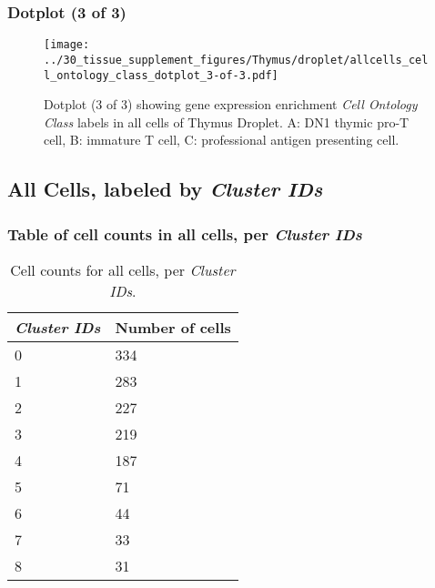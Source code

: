 \clearpage

\subsubsection{Dotplot (3 of 3)}
\begin{figure}[h]
\centering
\texttt{[image: ../30\_tissue\_supplement\_figures/Thymus/droplet/allcells\_cell\_ontology\_class\_dotplot\_3-of-3.pdf]}

\caption{ Dotplot (3 of 3)  showing gene expression enrichment \emph{Cell Ontology Class} labels in all cells of Thymus Droplet. A: DN1 thymic pro-T cell, B: immature T cell, C: professional antigen presenting cell.}
\end{figure}


\clearpage

\subsection{All Cells, labeled by \emph{Cluster IDs}}
\subsubsection{Table of cell counts in all cells, per \emph{Cluster IDs}}\begin{table}[h]
\centering
\label{my-label}
\begin{tabular}{@{}ll@{}}
\toprule

\emph{Cluster IDs}& Number of cells \\ \midrule
0 & 334 \\

1 & 283 \\

2 & 227 \\

3 & 219 \\

4 & 187 \\

5 & 71 \\

6 & 44 \\

7 & 33 \\

8 & 31 \\
\bottomrule
\end{tabular}
\caption{Cell counts for all cells, per \emph{Cluster IDs}.}
\end{table}

